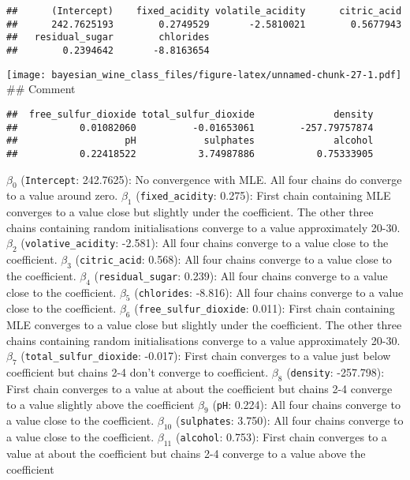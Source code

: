 \documentclass[
]{article}
\newenvironment{Shaded}{\begin{snugshade}}{\end{snugshade}}
\newcommand{\DecValTok}[1]{\textcolor[rgb]{0.00,0.00,0.81}{#1}}
\newcommand{\NormalTok}[1]{#1}
\newcommand{\SpecialCharTok}[1]{\textcolor[rgb]{0.00,0.00,0.00}{#1}}
\begin{document}
\begin{verbatim}
##      (Intercept)    fixed_acidity volatile_acidity      citric_acid 
##      242.7625193        0.2749529       -2.5810021        0.5677943 
##   residual_sugar        chlorides 
##        0.2394642       -8.8163654
\end{verbatim}

\texttt{[image: bayesian\_wine\_class\_files/figure-latex/unnamed-chunk-27-1.pdf]}
\#\# Comment

\begin{Shaded}
\end{Shaded}

\begin{verbatim}
##  free_sulfur_dioxide total_sulfur_dioxide              density 
##           0.01082060          -0.01653061        -257.79757874 
##                   pH            sulphates              alcohol 
##           0.22418522           3.74987886           0.75333905
\end{verbatim}

\(\beta_0\) (\texttt{Intercept}: 242.7625): No convergence with MLE. All
four chains do converge to a value around zero. \(\beta_1\)
(\texttt{fixed\_acidity}: 0.275): First chain containing MLE converges
to a value close but slightly under the coefficient. The other three
chains containing random initialisations converge to a value
approximately 20-30. \(\beta_2\) (\texttt{volative\_acidity}: -2.581):
All four chains converge to a value close to the coefficient.
\(\beta_3\) (\texttt{citric\_acid}: 0.568): All four chains converge to
a value close to the coefficient. \(\beta_4\) (\texttt{residual\_sugar}:
0.239): All four chains converge to a value close to the coefficient.
\(\beta_5\) (\texttt{chlorides}: -8.816): All four chains converge to a
value close to the coefficient. \(\beta_6\)
(\texttt{free\_sulfur\_dioxide}: 0.011): First chain containing MLE
converges to a value close but slightly under the coefficient. The other
three chains containing random initialisations converge to a value
approximately 20-30. \(\beta_7\) (\texttt{total\_sulfur\_dioxide}:
-0.017): First chain converges to a value just below coefficient but
chains 2-4 don't converge to coefficient. \(\beta_8\) (\texttt{density}:
-257.798): First chain converges to a value at about the coefficient but
chains 2-4 converge to a value slightly above the coefficient
\(\beta_9\) (\texttt{pH}: 0.224): All four chains converge to a value
close to the coefficient. \(\beta_{10}\) (\texttt{sulphates}: 3.750):
All four chains converge to a value close to the coefficient.
\(\beta_{11}\) (\texttt{alcohol}: 0.753): First chain converges to a
value at about the coefficient but chains 2-4 converge to a value above
the coefficient
\end{document}
